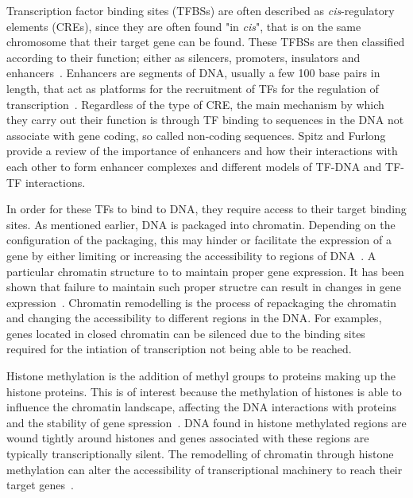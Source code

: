         Transcription factor binding sites (TFBSs) are often described as \emph{cis}-regulatory elements (CREs), since they are often found "in \emph{cis}", that is on the same chromosome that their target gene can be found. These TFBSs are then classified according to their function; either as silencers, promoters, insulators and enhancers~\cite{gaszner2006insulators, gross1988nuclease, li1999locus}. Enhancers are segments of DNA, usually a few 100 base pairs in length, that act as platforms for the recruitment of TFs for the regulation of transcription~\cite{spitz2012transcription}. Regardless of the type of CRE, the main mechanism by which they carry out their function is through TF binding to sequences in the DNA not associate with gene coding, so called non-coding sequences. Spitz and Furlong~\cite{spitz2012transcription} provide a review of the importance of enhancers and how their interactions with each other to form enhancer complexes and different models of TF-DNA and TF-TF interactions. 
        
        In order for these TFs to bind to DNA, they require access to their target binding sites. As mentioned earlier, DNA is packaged into chromatin. Depending on the configuration of the packaging, this may hinder or facilitate the expression of a gene by either limiting or increasing the accessibility to regions of DNA~\cite{li2007role}. A particular chromatin structure to to maintain proper gene expression. It has been shown that failure to maintain such proper structre can result in changes in gene expression~\cite{ehrlich2001dna}. Chromatin remodelling is the process of repackaging the chromatin and changing the accessibility to different regions in the DNA. For examples, genes located in closed chromatin can be silenced due to the binding sites required for the intiation of transcription not being able to be reached.

        Histone methylation is the addition of methyl groups to proteins making up the histone proteins. This is of interest because the methylation of histones is able to influence the chromatin landscape, affecting the DNA interactions with proteins and the stability of gene spression~\cite{jaenisch2003epigenetic, whetstine2009histone}. DNA found in histone methylated regions are wound tightly around histones and genes associated with these regions are typically transcriptionally silent. The remodelling of chromatin through histone methylation can alter the accessibility of transcriptional machinery to reach their target genes~\cite{gibney2010epigenetics, holoch2015rna}.

